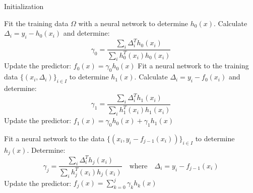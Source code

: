 \begin{algorithm}
	\caption{Initialization}\label{algorithm_first}
	\begin{algorithmic}[1]
		\State Fit the training data $\Omega$ with a neural network to determine $h_0(x)$.
		\State Calculate $\Delta_i=y_i-h_0(x_i)$ and determine:
		\begin{equation*}
			\gamma_0=\frac{\sum_{i}\Delta_i^Th_0(x_i)}{\sum_{i}h_0^T(x_i)h_0(x_i)}
		\end{equation*}
		\State Update the predictor: $f_0(x)=\gamma_0h_0(x)$
		\State Fit a neural network to the training data $\{(x_i, \Delta_i)\}_{i\in I}$ to determine $h_1(x)$.
		\State Calculate $\Delta_i=y_i-f_0(x_i)$ and determine:
		\begin{equation*}
		\gamma_1=\frac{\sum_{i}\Delta_i^Th_1(x_i)}{\sum_{i}h_1^T(x_i)h_1(x_i)}
		\end{equation*}
		\State Update the predictor: $f_1(x)=\gamma_0h_0(x)+\gamma_1h_1(x)$
	\end{algorithmic}
\end{algorithm}

\begin{algorithm}
	\caption{}\label{algorithm_loop}
	\begin{algorithmic}[1]
		\State Fit a neural network to the data $\{(x_i, y_i-f_{j-1}(x_i))\}_{i\in I}$ to determine $h_j(x)$.
		\State Determine:
		\begin{equation*}
		\gamma_j=\frac{\sum_{i}\Delta_i^Th_j(x_i)}{\sum_{i}h_j^T(x_i)h_j(x_i)}\quad\text{where}\quad\Delta_i=y_i-f_{j-1}(x_i)
		\end{equation*}
		\State Update the predictor: $f_j(x)=\sum_{k=0}^{j}\gamma_kh_k(x)$
	\end{algorithmic}
\end{algorithm}

